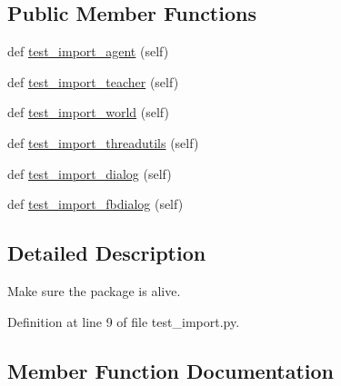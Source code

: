 \subsection*{Public Member Functions}
\begin{DoxyCompactItemize}
\item 
def \hyperlink{classtests_1_1test__import_1_1TestImport_acfd2119a3ad738cad370cf72ef7e7423}{test\+\_\+import\+\_\+agent} (self)
\item 
def \hyperlink{classtests_1_1test__import_1_1TestImport_af48db1b740c81424df27e10c66481770}{test\+\_\+import\+\_\+teacher} (self)
\item 
def \hyperlink{classtests_1_1test__import_1_1TestImport_a7eb4091dcd3395e147659ec3a49be488}{test\+\_\+import\+\_\+world} (self)
\item 
def \hyperlink{classtests_1_1test__import_1_1TestImport_a3a90634703bb67d0bb0b3ac5352657ad}{test\+\_\+import\+\_\+threadutils} (self)
\item 
def \hyperlink{classtests_1_1test__import_1_1TestImport_a5dcc13dee044ad4be07523f024b13db2}{test\+\_\+import\+\_\+dialog} (self)
\item 
def \hyperlink{classtests_1_1test__import_1_1TestImport_ad030b185d0f0b02e1d8606d578d48820}{test\+\_\+import\+\_\+fbdialog} (self)
\end{DoxyCompactItemize}


\subsection{Detailed Description}
\begin{DoxyVerb}Make sure the package is alive.\end{DoxyVerb}
 

Definition at line 9 of file test\+\_\+import.\+py.



\subsection{Member Function Documentation}
\mbox{\label{classtests_1_1test__import_1_1TestImport_acfd2119a3ad738cad370cf72ef7e7423}} 
